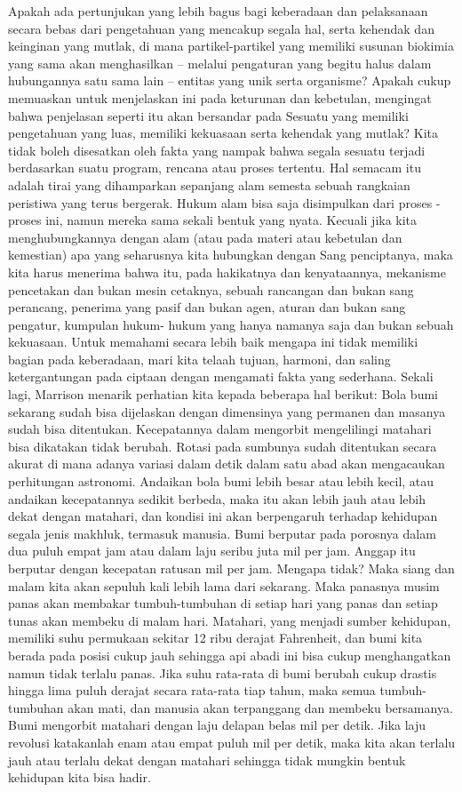 \documentclass[]{article}
\begin{document}
Apakah ada pertunjukan yang lebih bagus bagi keberadaan dan pelaksanaan secara bebas dari pengetahuan yang mencakup segala hal, serta kehendak dan keinginan yang mutlak, di mana partikel-partikel yang memiliki susunan biokimia yang sama akan menghasilkan -- melalui pengaturan yang begitu halus dalam hubungannya satu sama lain --  entitas yang unik serta organisme? Apakah cukup memuaskan untuk menjelaskan ini pada keturunan dan kebetulan, mengingat bahwa penjelasan seperti itu akan bersandar pada Sesuatu yang memiliki pengetahuan yang luas,  memiliki kekuasaan serta kehendak yang mutlak? 
Kita tidak boleh disesatkan oleh fakta yang nampak bahwa segala sesuatu terjadi berdasarkan suatu program, rencana atau proses tertentu. Hal semacam itu adalah tirai yang dihamparkan sepanjang alam semesta sebuah rangkaian peristiwa yang terus bergerak. Hukum alam bisa saja disimpulkan dari proses -proses ini, namun mereka sama sekali bentuk yang nyata. Kecuali jika kita menghubungkannya dengan alam (atau pada materi atau kebetulan dan kemestian) apa yang seharusnya kita hubungkan dengan Sang penciptanya, maka kita harus menerima bahwa itu, pada hakikatnya dan kenyataannya, mekanisme pencetakan dan bukan mesin cetaknya, sebuah rancangan dan bukan sang perancang, penerima yang pasif dan bukan agen, aturan dan bukan sang pengatur, kumpulan hukum- hukum yang hanya namanya saja dan bukan sebuah kekuasaan.
Untuk memahami secara lebih baik mengapa ini tidak memiliki bagian pada keberadaan, mari kita telaah tujuan, harmoni, dan saling ketergantungan pada ciptaan dengan mengamati fakta yang sederhana. Sekali lagi, Marrison menarik perhatian kita kepada beberapa hal berikut: 
Bola bumi sekarang sudah bisa dijelaskan dengan dimensinya yang permanen dan masanya sudah bisa ditentukan.  Kecepatannya dalam mengorbit mengelilingi matahari bisa dikatakan tidak berubah. Rotasi pada sumbunya sudah ditentukan secara akurat di mana adanya variasi dalam detik dalam satu abad akan mengacaukan perhitungan astronomi. Andaikan bola bumi lebih besar atau lebih kecil, atau andaikan kecepatannya sedikit berbeda, maka itu akan lebih jauh atau lebih dekat dengan matahari, dan kondisi ini akan berpengaruh terhadap kehidupan segala jenis makhluk, termasuk manusia. 
Bumi berputar pada porosnya dalam dua puluh empat jam atau dalam laju seribu juta mil per jam. Anggap itu berputar dengan kecepatan ratusan mil per jam. Mengapa tidak? Maka siang dan malam kita akan sepuluh kali lebih lama dari sekarang. Maka panasnya musim panas akan membakar tumbuh-tumbuhan di setiap hari yang panas dan setiap tunas akan membeku di malam hari. Matahari, yang menjadi sumber kehidupan, memiliki suhu permukaan sekitar 12 ribu derajat Fahrenheit, dan bumi kita berada pada posisi cukup jauh sehingga api abadi ini bisa cukup menghangatkan namun tidak terlalu panas. Jika suhu rata-rata di bumi berubah cukup drastis hingga lima puluh derajat  secara rata-rata tiap tahun, maka semua tumbuh-tumbuhan akan mati, dan manusia akan terpanggang dan membeku bersamanya. Bumi mengorbit matahari dengan laju delapan belas mil per detik. Jika laju revolusi katakanlah enam atau  empat puluh mil per detik, maka kita akan terlalu jauh atau terlalu dekat dengan matahari sehingga tidak mungkin bentuk kehidupan kita bisa hadir.
\end{document}
